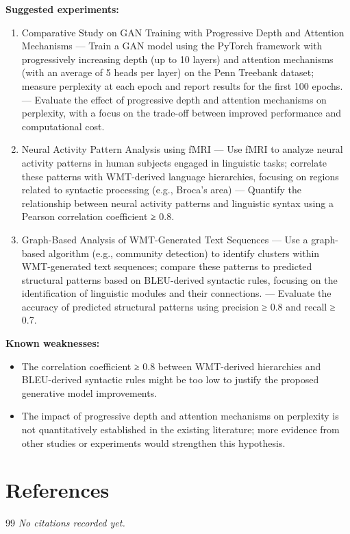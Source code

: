 \documentclass[12pt,a4paper]{article}
\begin{document}
\textbf{Suggested experiments:}
\begin{enumerate}
  \item Comparative Study on GAN Training with Progressive Depth and Attention Mechanisms — Train a GAN model using the PyTorch framework with progressively increasing depth (up to 10 layers) and attention mechanisms (with an average of 5 heads per layer) on the Penn Treebank dataset; measure perplexity at each epoch and report results for the first 100 epochs. — Evaluate the effect of progressive depth and attention mechanisms on perplexity, with a focus on the trade-off between improved performance and computational cost.
  \item Neural Activity Pattern Analysis using fMRI — Use fMRI to analyze neural activity patterns in human subjects engaged in linguistic tasks; correlate these patterns with WMT-derived language hierarchies, focusing on regions related to syntactic processing (e.g., Broca's area) — Quantify the relationship between neural activity patterns and linguistic syntax using a Pearson correlation coefficient ≥ 0.8.
  \item Graph-Based Analysis of WMT-Generated Text Sequences — Use a graph-based algorithm (e.g., community detection) to identify clusters within WMT-generated text sequences; compare these patterns to predicted structural patterns based on BLEU-derived syntactic rules, focusing on the identification of linguistic modules and their connections. — Evaluate the accuracy of predicted structural patterns using precision ≥ 0.8 and recall ≥ 0.7.
\end{enumerate}

\textbf{Known weaknesses:}
\begin{itemize}
  \item The correlation coefficient ≥ 0.8 between WMT-derived hierarchies and BLEU-derived syntactic rules might be too low to justify the proposed generative model improvements.
  \item The impact of progressive depth and attention mechanisms on perplexity is not quantitatively established in the existing literature; more evidence from other studies or experiments would strengthen this hypothesis.
\end{itemize}


\section{References}

\begin{thebibliography}{99}
\textit{No citations recorded yet.}
\end{thebibliography}
\end{document}
